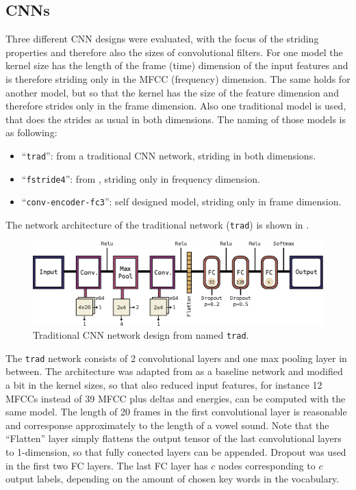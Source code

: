 \subsection{CNNs}\label{sec:nn_arch_cnn}
Three different CNN designs were evaluated, with the focus of the striding properties and therefore also the sizes of convolutional filters.
For one model the kernel size has the length of the frame (time) dimension of the input features and is therefore striding only in the MFCC (frequency) dimension.
The same holds for another model, but so that the kernel has the size of the feature dimension and therefore strides only in the frame dimension.
Also one traditional model is used, that does the strides as usual in both dimensions.
The naming of those models is as following:
\begin{itemize}
	\item \enquote{\texttt{trad}}: from \cite{Sainath2015} a traditional CNN network, striding in both dimensions.
	\item \enquote{\texttt{fstride4}}: from \cite{Sainath2015}, striding only in frequency dimension.
	\item \enquote{\texttt{conv-encoder-fc3}}: self designed model, striding only in frame dimension.
\end{itemize}
The network architecture of the traditional network (\texttt{trad}) is shown in .
\begin{figure}[!ht]
  \centering
    \includegraphics[height=0.2\textwidth]{./4_nn/figs/nn_arch_cnn_trad.eps}
  \caption{Traditional CNN network design from \cite{Sainath2015} named \texttt{trad}.}
  \label{fig:nn_arch_cnn_trad}
\end{figure}
\FloatBarrier
\noindent
The \texttt{trad} network consists of 2 convolutional layers and one max pooling layer in between.
The architecture was adapted from \cite{Sainath2015} as a baseline network and modified a bit in the kernel sizes, so that also reduced input features, for instance 12 MFCCs instead of 39 MFCC plus deltas and energies, can be computed with the same model.
The length of 20 frames in the first convolutional layer is reasonable and corresponse approximately to the length of a vowel sound.
Note that the \enquote{Flatten} layer simply flattens the output tensor of the last convolutional layers to 1-dimension, so that fully conected layers can be appended.
Dropout was used in the first two FC layers.
The last FC layer has $c$ nodes corresponding to $c$ output labels, depending on the amount of chosen key words in the vocabulary.

